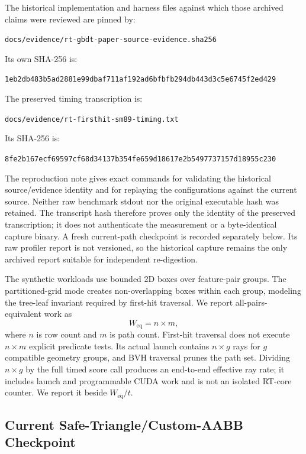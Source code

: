 \documentclass[11pt]{article}
\begin{document}
The historical implementation and harness files against which those archived
claims were reviewed are pinned by:
\begin{center}
\footnotesize
\texttt{docs/evidence/rt-gbdt-paper-source-evidence.sha256}
\end{center}
Its own SHA-256 is:
\begin{center}
\footnotesize
\texttt{1eb2db483b5ad2881e99dbaf711af192ad6bfbfb294db443d3c5e6745f2ed429}
\end{center}
The preserved timing transcription is:
\begin{center}
\footnotesize
\texttt{docs/evidence/rt-firsthit-sm89-timing.txt}
\end{center}
Its SHA-256 is:
\begin{center}
\footnotesize
\texttt{8fe2b167ecf69597cf68d34137b354fe659d18617e2b5497737157d18955c230}
\end{center}
The reproduction note gives exact commands for validating the historical
source/evidence identity and for replaying the configurations against the
current source. Neither raw benchmark stdout nor the original executable hash
was retained. The transcript hash therefore proves only the identity of the
preserved transcription; it does not authenticate the measurement or a
byte-identical capture binary. A fresh current-path checkpoint is recorded
separately below. Its raw profiler report is not versioned, so the historical
capture remains the only archived report suitable for independent re-digestion.

The synthetic workloads use bounded 2D boxes over feature-pair groups. The
partitioned-grid mode creates non-overlapping boxes within each group, modeling
the tree-leaf invariant required by first-hit traversal. We report
all-pairs-equivalent work as
\[
  W_{\mathrm{eq}} = n \times m ,
\]
where $n$ is row count and $m$ is path count. First-hit traversal does not
execute $n \times m$ explicit predicate tests. Its actual launch contains
$n \times g$ rays for $g$ compatible geometry groups, and BVH traversal prunes
the path set. Dividing $n \times g$ by the full timed score call produces an
end-to-end effective ray rate; it includes launch and programmable CUDA work and
is not an isolated RT-core counter. We report it beside $W_{\mathrm{eq}}/t$.

\subsection{Current Safe-Triangle/Custom-AABB Checkpoint}
\end{document}
